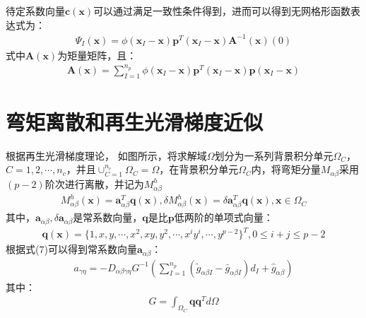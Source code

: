 \documentclass[11pt,a4paper]{article}
\begin{document}
待定系数向量$\pmb{c}(\pmb{x})$可以通过满足一致性条件得到，进而可以得到无网格形函数表达式为：
\begin{equation}
\begin{split}
\Psi_I(\pmb{x})=\phi(\pmb{x}_I-\pmb{x})\pmb{p}^T(\pmb{x}_I-\pmb{x})\pmb{A}^{-1}(\pmb{x})(0)
\end{split}
\end{equation}
式中$\pmb{A}(\pmb{x})$为矩量矩阵，且：
\begin{equation}
\begin{split}
    \pmb{A}(\pmb{x})=\sum_{I=1}^{n_p}\phi(\pmb{x}_I-\pmb{x})\pmb{p}^T(\pmb{x}_I-\pmb{x})\pmb{p}(\pmb{x}_I-\pmb{x})
\end{split}
\end{equation}
\section{弯矩离散和再生光滑梯度近似}
根据再生光滑梯度理论，
如图所示，将求解域$\Omega$划分为一系列背景积分单元$\Omega_C$，$C=1,2,\dotsb,n_c$，并且$\cup_{C=1}^{n_c}\Omega_C=\Omega$，在背景积分单元$\Omega_C$内，将弯矩分量$M_{\alpha\beta}$采用$(p-2)$阶次进行离散，并记为$M_{\alpha\beta}^h$
\begin{equation}
\begin{split}
    M_{\alpha\beta}^h(\pmb{x})=\pmb{a}^T_{\alpha\beta}\pmb{q}(\pmb{x}),\delta M_{\alpha\beta}^h(\pmb{x})=\delta \pmb{a}^T_{\alpha\beta}\pmb{q}(\pmb{x}),\pmb{x}\in\Omega_C
\end{split}
\end{equation}
其中，$\pmb a_{\alpha\beta},\delta \pmb a_{\alpha\beta}$是常系数向量，$\pmb{q}$是比$\pmb{p}$低两阶的单项式向量：
\begin{equation}
\begin{split}
    \pmb{q}(\pmb{x})=\{1,x,y,\dotsb,x^2,xy,y^2,\dotsb,x^iy^i,\dotsb,y^{p-2}\}^T,0\le i+j\le p-2
\end{split}
\end{equation}
根据式(7)可以得到常系数向量$\pmb{a}_{\alpha\beta}$：
\begin{equation}
\begin{split}
    a_{\gamma\eta}=-D_{\alpha\beta\gamma\eta}G^{-1}(\sum_{I=1}^{n_p}(\tilde{g}_{\alpha\beta I}-\bar{g}_{\alpha\beta I})d_I+\hat{g}_{\alpha\beta})
\end{split}
\end{equation}
其中：
\begin{equation}
\begin{split}
    G=\int_{\Omega_C}\pmb{q}\pmb{q}^Td\Omega
\end{split}
\end{equation}
\end{document}
